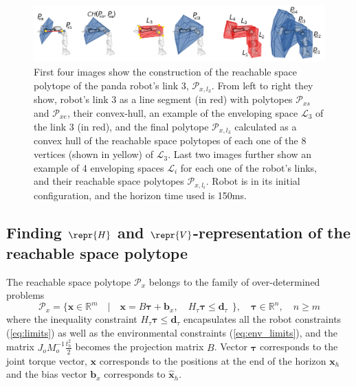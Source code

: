\begin{figure}[!t]
    \centering
    \includegraphics[width=\linewidth]{Papers/images/minkowski3.png}
    \caption{ First four images show the construction of the reachable space polytope of the panda robot's link 3, $\mathcal{P}_{x,l_3}$. From left to right they show, robot's link 3 as a line segment (in red) with polytopes $\mathcal{P}_{xs}$ and $\mathcal{P}_{xe}$, their convex-hull, an example of the enveloping space $\mathcal{L}_3$ of the link 3 (in red), and the final polytope $\mathcal{P}_{x,l_3}$ calculated as a convex hull of the reachable space polytopes of each one of the 8 vertices (shown in yellow) of $\mathcal{L}_3$.
    Last two images further show an example of 4 enveloping spaces $\mathcal{L}_i$ for each one of the robot's links, and their reachable space polytopes $\mathcal{P}_{x,l_i}$. Robot is in its initial configuration, and the horizon time used is 150ms.}
    \label{fig:minkowski}

\end{figure}


\subsection{Finding $\repr{H}$ and $\repr{V}$-representation of the reachable space polytope}
\label{ch:enumerating}

The reachable space polytope $\mathcal{P}_x$ belongs to the family of over-determined problems
\begin{equation}
    \mathcal{P}_x = \{ \bm{x} \in \mathbb{R}^m \quad| \quad \bm{x}=B\bm{\tau} + \bm{b}_x,\quad  H_\tau\bm{\tau}\leq \bm{d}_\tau ~~\}, \quad \bm{\tau}\in \mathbb{R}^n, \quad n\geq m
\label{eq:polytope_family}
\end{equation}
where the inequality constraint $H_\tau\bm{\tau}\leq \bm{d}_\tau$ encapsulates all the robot constraints (\ref{eq:limits}) as well as the environmental constraints (\ref{eq:env_limits}), and the matrix $J_o M_o^{-1}\frac{t_h^2}{2}$ becomes the projection matrix $B$. Vector $\bm{\tau}$ corresponds to the joint torque vector, $\bm{x}$ corresponds to the positions at the end of the horizon $\bm{x}_{h}$ and the bias vector $\bm{b}_x$ corresponds to $\hat{\bm{x}}_{h}$. 

